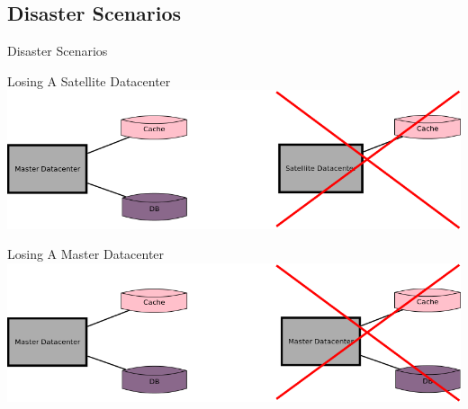 \documentclass[aspectratio=43]{beamer}
\begin{document}
\subsection{Disaster Scenarios}

{
\begin{frame}{Disaster Scenarios}
\end{frame}
}

\begin{frame}{Losing A Satellite Datacenter}
    \includegraphics[width=\textwidth]{images/lostsatellitedc.png}
\end{frame}

\begin{frame}{Losing A Master Datacenter}
    \includegraphics[width=\textwidth]{images/lostmasterdc.png}
\end{frame}
\end{document}
